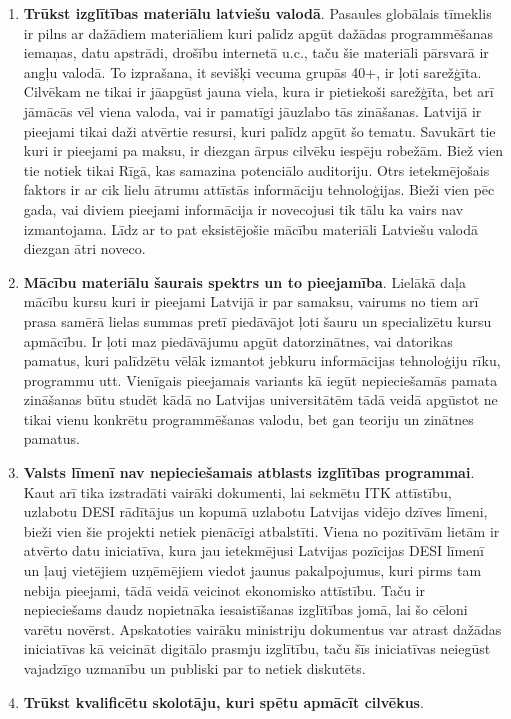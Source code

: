 \begin{enumerate}
    \item \textbf{Trūkst izglītības materiālu latviešu valodā}.
Pasaules globālais tīmeklis ir pilns ar dažādiem materiāliem kuri palīdz apgūt dažādas programmēšanas iemaņas,
datu apstrādi, drošību internetā u.c., taču šie materiāli pārsvarā ir angļu valodā. To izprašana, it sevišķi 
vecuma grupās 40+, ir ļoti sarežģīta. Cilvēkam ne tikai ir jāapgūst jauna viela, kura ir pietiekoši sarežģīta,
bet arī jāmācās vēl viena valoda, vai ir pamatīgi jāuzlabo tās zināšanas. Latvijā ir pieejami tikai daži 
atvērtie resursi, kuri palīdz apgūt šo tematu. Savukārt tie kuri ir pieejami pa maksu, ir diezgan ārpus cilvēku
iespēju robežām. Biež vien tie notiek tikai Rīgā, kas samazina potenciālo auditoriju. Otrs ietekmējošais faktors
ir ar cik lielu ātrumu attīstās informāciju tehnoloģijas. Bieži vien pēc gada, vai diviem pieejami informācija
ir novecojusi tik tālu ka vairs nav izmantojama. Līdz ar to pat eksistējošie mācību materiāli Latviešu valodā
diezgan ātri noveco.
    \item \textbf{Mācību materiālu šaurais spektrs un to pieejamība}.
Lielākā daļa mācību kursu kuri ir pieejami Latvijā ir par samaksu, vairums no tiem arī prasa samērā lielas
summas pretī piedāvājot ļoti šauru un specializētu kursu apmācību. Ir ļoti maz piedāvājumu apgūt datorzinātnes,
vai datorikas pamatus, kuri palīdzētu vēlāk izmantot jebkuru informācijas tehnoloģiju rīku, programmu utt.
Vienīgais pieejamais variants kā iegūt nepieciešamās pamata zināšanas būtu studēt kādā no Latvijas universitātēm
tādā veidā apgūstot ne tikai vienu konkrētu programmēšanas valodu, bet gan teoriju un zinātnes pamatus.
    \item \textbf{Valsts līmenī nav nepieciešamais atblasts izglītības programmai}.
Kaut arī tika izstradāti vairāki dokumenti, lai sekmētu ITK attīstību, uzlabotu DESI rādītājus un kopumā uzlabotu
Latvijas vidējo dzīves līmeni, bieži vien šie projekti netiek pienācīgi atbalstīti. Viena no pozitīvām lietām
ir atvērto datu iniciatīva, kura jau ietekmējusi Latvijas pozīcijas DESI līmenī un ļauj vietējiem uzņēmējiem
viedot jaunus pakalpojumus, kuri pirms tam nebija pieejami, tādā veidā veicinot ekonomisko attīstību. Taču ir
nepieciešams daudz nopietnāka iesaistīšanas izglītības jomā, lai šo cēloni varētu novērst. Apskatoties vairāku
ministriju dokumentus var atrast dažādas iniciatīvas kā veicināt digitālo prasmju izglītību, taču šīs iniciatīvas
neiegūst vajadzīgo uzmanību un publiski par to netiek diskutēts.
    \item \textbf{Trūkst kvalificētu skolotāju, kuri spētu apmācīt cilvēkus}.

\end{enumerate}
